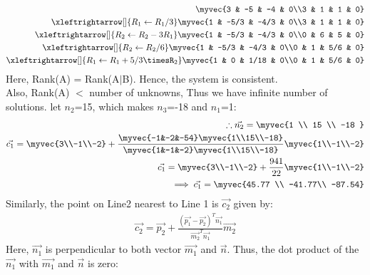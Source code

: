 \documentclass[journal,12pt,twocolumn]{IEEEtran}
\begin{document}
\begin{align}
\myvec{3 & -5 & -4 & 0\\3 & 1 & 1 & 0}\\
\xleftrightarrow[]{R_1\leftarrow R_1/3}
\myvec{1 & -5/3 & -4/3 & 0\\3 & 1 & 1 & 0}\\
\xleftrightarrow[]{R_2\leftarrow R_2-3R_1}
\myvec{1 & -5/3 & -4/3 & 0\\0 & 6 & 5 & 0}\\
\xleftrightarrow[]{R_2\leftarrow R_2/6}
\myvec{1 & -5/3 & -4/3 & 0\\0 & 1 & 5/6 & 0}\\
\xleftrightarrow[]{R_1\leftarrow R_1+5/3\timesR_2}
\myvec{1 & 0 & 1/18 & 0\\0 & 1 & 5/6 & 0}
\end{align} 
Here, Rank(A) = Rank(A$\mid$B). Hence, the system is consistent. 
\\
Also, Rank(A) $<$ number of unknowns, Thus we have infinite number of solutions. let $n_2$=15, which makes $n_3$=-18 and $n_1$=1:
\begin{align}
    \therefore \vec{n_2}=\myvec{1 \\ 15 \\ -18 }\\
\vec{c_1}= \myvec{3\\-1\\-2}+\frac{\myvec{-1&-2&-54} \myvec{1\\15\\-18}}{\myvec{1&-1&-2} \myvec{1\\15\\-18}}\myvec{1\\-1\\-2}\\
\vec{c_1}= \myvec{3\\-1\\-2}+\frac{941}{22}\myvec{1\\-1\\-2}\\
\implies \vec{c_1}=\myvec{45.77 \\ -41.77\\ -87.54}
\end{align}
\newpage \noindent
Similarly, the point on Line2 nearest to Line 1 is $\vec{c_2}$ given by:\\
\begin{align}
\vec{c_2}=\vec{p_2}+\frac{(\vec{p_1}-\vec{p_2})^T \vec{n_1}}{\vec{m_2}^T \vec{n_1}}\vec{m_2} 
\end{align}
Here, $\Vec{n_1}$ is perpendicular to both vector $\Vec{m_1}$ and $\Vec{n}$. Thus, the dot product of the $\Vec{n_1}$ with $\Vec{m_1}$ and $\Vec{n}$ is zero:
\end{document}
